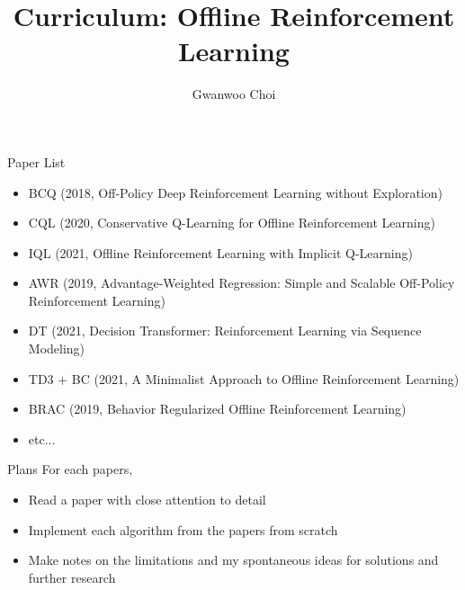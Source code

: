 \documentclass{beamer}
\title{Curriculum: Offline Reinforcement Learning}
\author{Gwanwoo Choi}
\begin{document}

\begin{frame}
    \titlepage
\end{frame}

\begin{frame}{Paper List}
    \begin{itemize}
        \item BCQ (2018, Off-Policy Deep Reinforcement Learning without Exploration)
        \item CQL (2020, Conservative Q-Learning for Offline Reinforcement Learning)
        \item IQL (2021, Offline Reinforcement Learning with Implicit Q-Learning)
        \item AWR (2019, Advantage-Weighted Regression: Simple and Scalable Off-Policy Reinforcement Learning)
        \item DT (2021, Decision Transformer: Reinforcement Learning via Sequence Modeling)
        \item TD3 + BC (2021, A Minimalist Approach to
Offline Reinforcement Learning)
        \item BRAC (2019, Behavior Regularized Offline Reinforcement Learning)
        \item etc...
    \end{itemize}
\end{frame}


\begin{frame}{Plans}
  For each papers,
  \begin{itemize}
    \item Read a paper with close attention to detail
    \item Implement each algorithm from the papers from scratch
    \item Make notes on the limitations and my spontaneous ideas for solutions and further research
  \end{itemize}
\end{frame}
\end{document}
